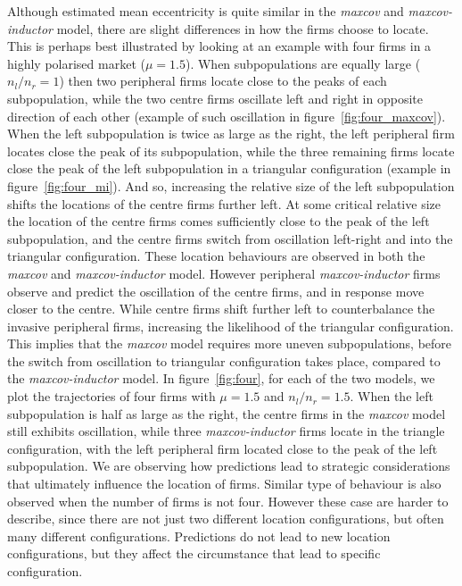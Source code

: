 \documentclass[preprint, 12pt]{elsarticle}
\begin{document}
Although estimated mean eccentricity is quite similar in the \emph{maxcov} and \emph{maxcov-inductor} model, there are slight differences in how the firms choose to locate. This is perhaps best illustrated by looking at an example with four firms in a highly polarised market ($\mu=1.5$). When subpopulations are equally large ($n_l/n_r = 1$) then two peripheral firms locate close to the peaks of each subpopulation, while the two centre firms oscillate left and right in opposite direction of each other (example of such oscillation in figure~\ref{fig:four_maxcov}). When the left subpopulation is twice as large as the right, the left peripheral firm locates close the peak of its subpopulation, while the three remaining firms locate close the peak of the left subpopulation in a triangular configuration (example in figure~\ref{fig:four_mi}). And so, increasing the relative size of the left subpopulation shifts the locations of the centre firms further left. At some critical relative size the location of the centre firms comes sufficiently close to the peak of the left subpopulation, and the centre firms switch from oscillation left-right and into the triangular configuration. These location behaviours are observed in both the \emph{maxcov} and \emph{maxcov-inductor} model. However peripheral \emph{maxcov-inductor} firms observe and predict the oscillation of the centre firms, and in response move closer to the centre. While centre firms shift further left to counterbalance the invasive peripheral firms, increasing the likelihood of the triangular configuration. This implies that the \emph{maxcov} model requires more uneven subpopulations, before the switch from oscillation to triangular configuration takes place, compared to the \emph{maxcov-inductor} model. In figure~\ref{fig:four}, for each of the two models, we plot the trajectories of four firms with $\mu=1.5$ and $n_l/n_r = 1.5$. When the left subpopulation is half as large as the right, the centre firms in the \emph{maxcov} model still exhibits oscillation, while three \emph{maxcov-inductor} firms locate in the triangle configuration, with the left peripheral firm located close to the peak of the left subpopulation. We are observing how predictions lead to strategic considerations that ultimately influence the location of firms. Similar type of behaviour is also observed when the number of firms is not four. However these case are harder to describe, since there are not just two different location configurations, but often many different configurations. Predictions do not lead to new location configurations, but they affect the circumstance that lead to specific configuration.
\end{document}
